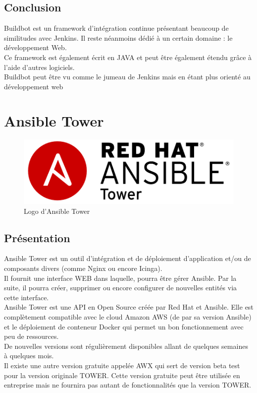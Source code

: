 \documentclass[12pt]{article}
\begin{document}
\subsection{Conclusion}
Buildbot est un framework d'intégration continue présentant beaucoup de similitudes avec Jenkins. Il reste néanmoins dédié à un certain domaine : le développement Web.
\\
Ce framework est également écrit en JAVA et peut être également étendu grâce à l'aide d'autres logiciels.
\\
Buildbot peut être vu comme le jumeau de Jenkins mais en étant plus orienté au développement web

\section{Ansible Tower}

\begin{figure}[ht]
    \includegraphics[scale=0.4]{images/ansible_tower.png}
    \caption{Logo d'Ansible Tower}
\end{figure}

\subsection{Présentation}
Ansible Tower est un outil d'intégration et de déploiement d'application et/ou de composants divers (comme Nginx ou encore Icinga). 
\\
Il fournit une interface WEB dans laquelle, pourra être gérer Ansible. Par la suite, il pourra créer, supprimer ou encore configurer de nouvelles entités via cette interface.
\\
Ansible Tower est une API en Open Source créée par Red Hat et Ansible. Elle est complètement compatible avec le cloud Amazon AWS (de par sa version Ansible) et le déploiement de conteneur Docker qui permet un bon fonctionnement avec peu de ressources.
\\
De nouvelles versions sont régulièrement disponibles allant de quelques semaines à quelques mois.
\\
Il existe une autre version gratuite appelée AWX qui sert de version beta test pour la version originale TOWER. Cette version gratuite peut être utilisée en entreprise mais ne fournira pas autant de fonctionnalités que la version TOWER.
\end{document}
